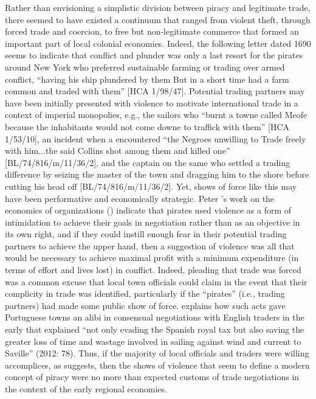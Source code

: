 Rather than envisioning a simplistic division between piracy and legitimate trade, there seemed to have existed a continuum that ranged from violent theft, through forced trade and coercion, to free but non-legitimate commerce that formed an important part of local colonial economies. Indeed, the following letter dated 1690 seems to indicate that conflict and plunder was only a last resort for the pirates around New York who preferred sustainable farming or trading over armed conflict, “having his ship plundered by them But in a short time had a farm common and traded with them” [HCA 1/98/47]. Potential trading partners may have been initially presented with violence to motivate international trade in a context of imperial monopolies, e.g., the sailors who “burnt a towne called Meofe because the inhabitants would not come downe to traffick with them” [HCA 1/53/10], an incident when a  encountered “the Negroes unwilling to Trade freely with him...the said Collins shot among them and killed one” [BL/74/816/m/11/36/2], and the captain on the same  who settled a trading difference by seizing the master of the town and dragging him to the shore before cutting his head off [BL/74/816/m/11/36/2]. Yet, shows of force like this may have been performative and economically strategic. Peter \citeauthor{Leeson2007}’s work on the economics of  organizations (\citeyear{Leeson2007,Leeson2008}) indicate that pirates used violence as a form of intimidation to achieve their goals in negotiation rather than as an objective in its own right, and if they could instill enough fear in their potential trading partners to achieve the upper hand, then a suggestion of violence was all that would be necessary to achieve maximal profit with a minimum expenditure (in terms of effort and lives lost) in conflict. Indeed, pleading that trade was forced was a common excuse that local town officials could claim in the event that their complicity in  trade was identified, particularly if the “pirates” (i.e., trading partners) had made some public show of force. \citeauthor{Bicheno2012} explains how such acts gave Portuguese towns an alibi in consensual negotiations with English traders in the early  that explained “not only evading the Spanish royal tax but also saving the greater loss of time and wastage involved in sailing against wind and current to Saville” (2012: 78). Thus, if the majority of local officials and traders were willing accomplices, as \citeauthor{Bicheno2012} suggests, then the shows of violence that seem to define a modern concept of piracy were no more than expected customs of trade negotiations in the context of the early regional economies. 


